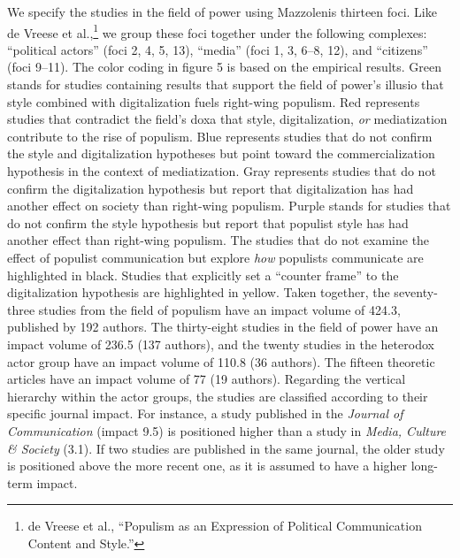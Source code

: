\documentclass{tufte-handout}
\begin{document}
We specify the studies in the field of power using
Mazzoleni\textquotesingle s thirteen foci. Like de Vreese et
al.,\footnote{de Vreese et al., ``Populism as an Expression of Political
  Communication Content and Style.''} we group these foci together under
the following complexes: ``political actors'' (foci 2, 4, 5, 13),
``media'' (foci 1, 3, 6--8, 12), and ``citizens'' (foci 9--11). The
color coding in figure 5 is based on the empirical results. Green stands
for studies containing results that support the field of power's illusio
that style combined with digitalization fuels right-wing populism. Red
represents studies that contradict the field's doxa that style,
digitalization, \emph{or} mediatization contribute to the rise of
populism. Blue represents studies that do not confirm the style and
digitalization hypotheses but point toward the commercialization
hypothesis in the context of mediatization. Gray represents studies that
do not confirm the digitalization hypothesis but report that
digitalization has had another effect on society than right-wing
populism. Purple stands for studies that do not confirm the style
hypothesis but report that populist style has had another effect than
right-wing populism. The studies that do not examine the effect of
populist communication but explore \emph{how} populists communicate are
highlighted in black. Studies that explicitly set a ``counter frame'' to
the digitalization hypothesis are highlighted in yellow. Taken together,
the seventy-three studies from the field of populism have an impact
volume of 424.3, published by 192 authors. The thirty-eight studies in
the field of power have an impact volume of 236.5 (137 authors), and the
twenty studies in the heterodox actor group have an impact volume of
110.8 (36 authors). The fifteen theoretic articles have an impact volume
of 77 (19 authors). Regarding the vertical hierarchy within the actor
groups, the studies are classified according to their specific journal
impact. For instance, a study published in the \emph{Journal of
Communication} (impact 9.5) is positioned higher than a study in
\emph{Media, Culture \& Society} (3.1). If two studies are published in
the same journal, the older study is positioned above the more recent
one, as it is assumed to have a higher long-term impact.
\end{document}
